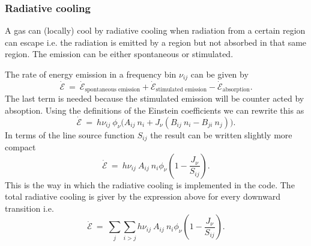 \documentclass[]{article}
\begin{document}
\subsubsection{Radiative cooling}

A gas can (locally) cool by radiative cooling when radiation from a certain region can escape i.e. the radiation is emitted by a region but not absorbed in that same region. The emission can be either spontaneous or stimulated.

\bigskip

The rate of energy emission in a frequency bin $\nu_{ij}$ can be given by
\begin{equation}
\dot{\mathcal{E}} \ = \ \dot{\mathcal{E}}_{\text{spontaneous emission}} + \dot{\mathcal{E}}_{\text{stimulated emission}} - \dot{\mathcal{E}}_{\text{absorption}} .
\end{equation}
The last term is needed because the stimulated emission will be counter acted by absoption. Using the definitions of the Einstein coefficients we can rewrite this as
\begin{equation}
\dot{\mathcal{E}} \ = \ h\nu_{ij} \ \phi_{\nu} \Big( A_{ij} \ n_{i}  + J_{\nu} \left( B_{ij} \ n_{i} - B_{ji} \ n_{j} \right) \Big).
\end{equation}
In terms of the line source function $S_{ij}$ the result can be written slightly more compact
\begin{equation}
\dot{\mathcal{E}} \ = \ h\nu_{ij} \ A_{ij} \ n_{i}  \phi_{\nu} \left( 1  - \frac{J_{\nu}}{S_{ij}} \right).
\end{equation}
This is the way in which the radiative cooling is implemented in the code. The total radiative cooling is giver by the expression above for every downward transition i.e.
\begin{equation}
\dot{\mathcal{E}} \ = \ \sum_{j} \sum_{i>j} h\nu_{ij} \ A_{ij} \ n_{i}  \phi_{\nu} \left( 1  - \frac{J_{\nu}}{S_{ij}} \right).
\end{equation}



\newpage



\end{document}
